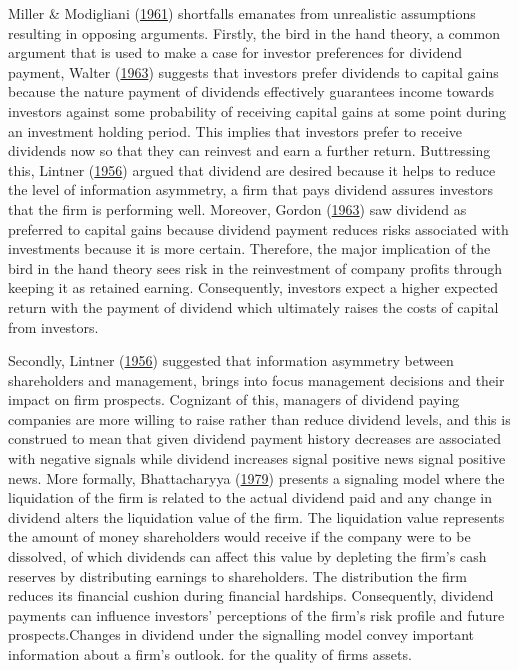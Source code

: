 \documentclass[11pt,preprint, authoryear]{elsarticle}
\numberwithin{equation}{section}
\numberwithin{figure}{section}
\numberwithin{table}{section}
\begin{document}
Miller \& Modigliani (\protect\hyperlink{ref-miller}{1961}) shortfalls
emanates from unrealistic assumptions resulting in opposing arguments.
Firstly, the bird in the hand theory, a common argument that is used to
make a case for investor preferences for dividend payment, Walter
(\protect\hyperlink{ref-walter1963dividend}{1963}) suggests that
investors prefer dividends to capital gains because the nature payment
of dividends effectively guarantees income towards investors against
some probability of receiving capital gains at some point during an
investment holding period. This implies that investors prefer to receive
dividends now so that they can reinvest and earn a further return.
Buttressing this, Lintner
(\protect\hyperlink{ref-lintner1956distribution}{1956}) argued that
dividend are desired because it helps to reduce the level of information
asymmetry, a firm that pays dividend assures investors that the firm is
performing well. Moreover, Gordon
(\protect\hyperlink{ref-gordon1963optimal}{1963}) saw dividend as
preferred to capital gains because dividend payment reduces risks
associated with investments because it is more certain. Therefore, the
major implication of the bird in the hand theory sees risk in the
reinvestment of company profits through keeping it as retained earning.
Consequently, investors expect a higher expected return with the payment
of dividend which ultimately raises the costs of capital from investors.

Secondly, Lintner
(\protect\hyperlink{ref-lintner1956distribution}{1956}) suggested that
information asymmetry between shareholders and management, brings into
focus management decisions and their impact on firm prospects. Cognizant
of this, managers of dividend paying companies are more willing to raise
rather than reduce dividend levels, and this is construed to mean that
given dividend payment history decreases are associated with negative
signals while dividend increases signal positive news signal positive
news. More formally, Bhattacharyya
(\protect\hyperlink{ref-bhattacharyya2007dividend}{1979}) presents a
signaling model where the liquidation of the firm is related to the
actual dividend paid and any change in dividend alters the liquidation
value of the firm. The liquidation value represents the amount of money
shareholders would receive if the company were to be dissolved, of which
dividends can affect this value by depleting the firm's cash reserves by
distributing earnings to shareholders. The distribution the firm reduces
its financial cushion during financial hardships. Consequently, dividend
payments can influence investors' perceptions of the firm's risk profile
and future prospects.Changes in dividend under the signalling model
convey important information about a firm's outlook. for the quality of
firms assets.
\end{document}
